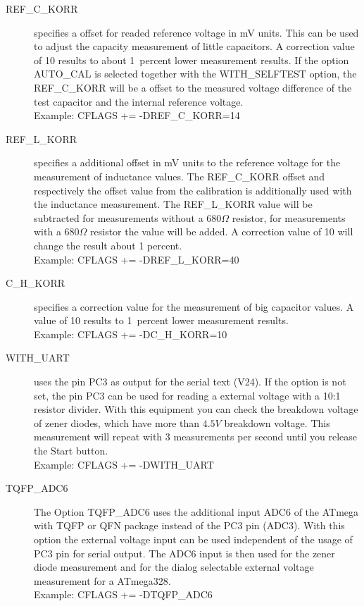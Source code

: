 \begin{description}
  \item[REF\_C\_KORR] specifies a offset for readed reference voltage in mV units.
This can be used to adjust the capacity measurement of little capacitors.
A correction value of 10 results to about 1~percent lower measurement results.
If the option AUTO\_CAL is selected together with the WITH\_SELFTEST option, the REF\_C\_KORR will be
a offset to the measured voltage difference of the test capacitor and the internal reference voltage.\\
Example:  CFLAGS += -DREF\_C\_KORR=14

  \item[REF\_L\_KORR] specifies a additional offset in mV units to the reference voltage for the measurement of
inductance values. 
The REF\_C\_KORR offset and respectively the offset value from the calibration is additionally used with the inductance measurement.
The REF\_L\_KORR value will be subtracted for measurements without a \(680\Omega\) resistor,
for measurements with a \(680\Omega\) resistor the value will be added.
A correction value of 10 will change the result about 1 percent.\\
Example: CFLAGS += -DREF\_L\_KORR=40

  \item[C\_H\_KORR] specifies a correction value for the measurement of big capacitor values.
A value of 10 results to 1~percent lower measurement results.\\
Example:  CFLAGS += -DC\_H\_KORR=10

  \item[WITH\_UART] uses the pin PC3 as output for the serial text (V24).
If the option is not set, the pin PC3 can be used for reading a external voltage with a 10:1 resistor divider.
With this equipment you can check the breakdown voltage of zener diodes, which have more than \(4.5V\) breakdown voltage.
This measurement will repeat with 3 measurements per second until you release the Start button.\\
Example: CFLAGS += -DWITH\_UART

  \item[TQFP\_ADC6] The Option TQFP\_ADC6 uses the additional input ADC6 of the ATmega with TQFP or QFN package instead of
the PC3 pin (ADC3).
With this option the external voltage input can be used independent of the usage of PC3 pin for serial output.
The ADC6 input is then used for the zener diode measurement and for the dialog selectable external voltage measurement
for a ATmega328.\\
Example: CFLAGS += -DTQFP\_ADC6


\end{description}
